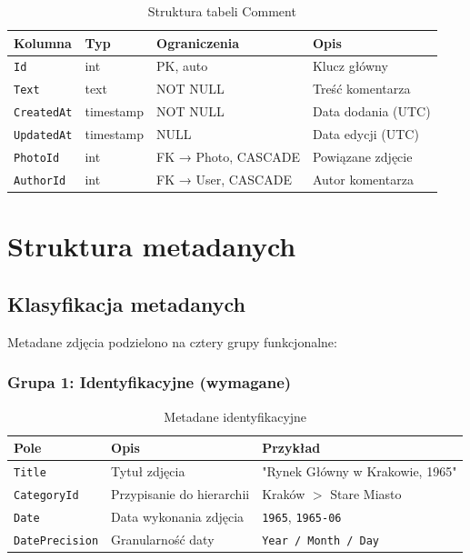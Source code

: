 \documentclass[12pt, a4paper]{article}
\begin{document}
\begin{table}[H]
  \centering
  \caption{Struktura tabeli Comment}
  \begin{tabular}{@{}L{3cm}L{2.5cm}L{3.5cm}L{4.5cm}@{}}
    \toprule
    \textbf{Kolumna} & \textbf{Typ} & \textbf{Ograniczenia} & \textbf{Opis} \\
    \midrule
    \texttt{Id}        & int       & PK, auto          & Klucz główny \\
    \texttt{Text}      & text      & NOT NULL          & Treść komentarza \\
    \texttt{CreatedAt} & timestamp & NOT NULL          & Data dodania (UTC) \\
    \texttt{UpdatedAt} & timestamp & NULL              & Data edycji (UTC) \\
    \texttt{PhotoId}   & int       & FK → Photo, CASCADE & Powiązane zdjęcie \\
    \texttt{AuthorId}  & int       & FK → User, CASCADE  & Autor komentarza \\
    \bottomrule
  \end{tabular}
\end{table}

\section{Struktura metadanych}

\subsection{Klasyfikacja metadanych}

Metadane zdjęcia podzielono na cztery grupy funkcjonalne:

\subsubsection{Grupa 1: Identyfikacyjne (wymagane)}

\begin{table}[H]
  \centering
  \caption{Metadane identyfikacyjne}
  \begin{tabular}{@{}L{3.5cm}L{5.5cm}L{5cm}@{}}
    \toprule
    \textbf{Pole} & \textbf{Opis} & \textbf{Przykład} \\
    \midrule
    \texttt{Title}         & Tytuł zdjęcia              & "Rynek Główny w Krakowie, 1965" \\
    \texttt{CategoryId}    & Przypisanie do hierarchii  & Kraków $>$ Stare Miasto \\
    \texttt{Date}          & Data wykonania zdjęcia     & \texttt{1965}, \texttt{1965-06} \\
    \texttt{DatePrecision} & Granularność daty          & \texttt{Year / Month / Day} \\
    \bottomrule
  \end{tabular}
\end{table}
\end{document}
